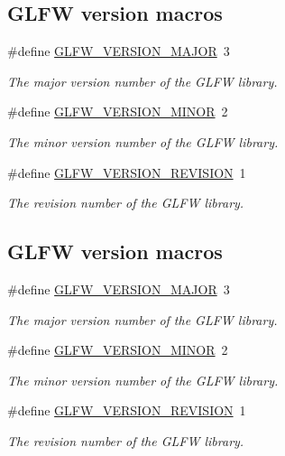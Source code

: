 \subsection*{G\+L\+FW version macros}
\begin{DoxyCompactItemize}
\item 
\#define \hyperlink{group__init_ga6337d9ea43b22fc529b2bba066b4a576}{G\+L\+F\+W\+\_\+\+V\+E\+R\+S\+I\+O\+N\+\_\+\+M\+A\+J\+OR}~3
\begin{DoxyCompactList}\small\item\em The major version number of the G\+L\+FW library. \end{DoxyCompactList}\item 
\#define \hyperlink{group__init_gaf80d40f0aea7088ff337606e9c48f7a3}{G\+L\+F\+W\+\_\+\+V\+E\+R\+S\+I\+O\+N\+\_\+\+M\+I\+N\+OR}~2
\begin{DoxyCompactList}\small\item\em The minor version number of the G\+L\+FW library. \end{DoxyCompactList}\item 
\#define \hyperlink{group__init_gab72ae2e2035d9ea461abc3495eac0502}{G\+L\+F\+W\+\_\+\+V\+E\+R\+S\+I\+O\+N\+\_\+\+R\+E\+V\+I\+S\+I\+ON}~1
\begin{DoxyCompactList}\small\item\em The revision number of the G\+L\+FW library. \end{DoxyCompactList}\end{DoxyCompactItemize}
\subsection*{G\+L\+FW version macros}
\begin{DoxyCompactItemize}
\item 
\#define \hyperlink{group__init_ga6337d9ea43b22fc529b2bba066b4a576}{G\+L\+F\+W\+\_\+\+V\+E\+R\+S\+I\+O\+N\+\_\+\+M\+A\+J\+OR}~3
\begin{DoxyCompactList}\small\item\em The major version number of the G\+L\+FW library. \end{DoxyCompactList}\item 
\#define \hyperlink{group__init_gaf80d40f0aea7088ff337606e9c48f7a3}{G\+L\+F\+W\+\_\+\+V\+E\+R\+S\+I\+O\+N\+\_\+\+M\+I\+N\+OR}~2
\begin{DoxyCompactList}\small\item\em The minor version number of the G\+L\+FW library. \end{DoxyCompactList}\item 
\#define \hyperlink{group__init_gab72ae2e2035d9ea461abc3495eac0502}{G\+L\+F\+W\+\_\+\+V\+E\+R\+S\+I\+O\+N\+\_\+\+R\+E\+V\+I\+S\+I\+ON}~1
\begin{DoxyCompactList}\small\item\em The revision number of the G\+L\+FW library. \end{DoxyCompactList}\end{DoxyCompactItemize}
